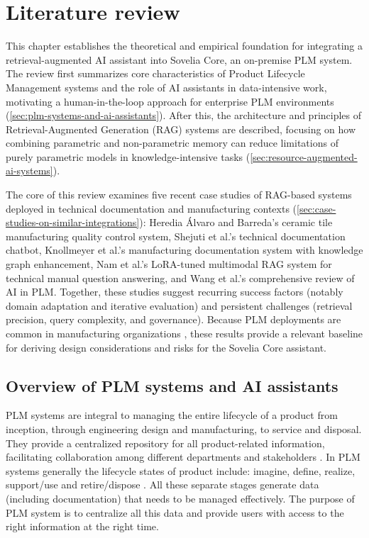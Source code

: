 \chapter{Literature review}
\label{ch:literature-review}

This chapter establishes the theoretical and empirical foundation for integrating a retrieval-augmented AI assistant into Sovelia Core, an on-premise PLM system. The review first summarizes core characteristics of Product Lifecycle Management systems and the role of AI assistants in data-intensive work, motivating a human-in-the-loop approach for enterprise PLM environments (\autoref{sec:plm-systems-and-ai-assistants}). After this, the architecture and principles of Retrieval-Augmented Generation (RAG) systems are described, focusing on how combining parametric and non-parametric memory can reduce limitations of purely parametric models in knowledge-intensive tasks (\autoref{sec:resource-augmented-ai-systems}).

The core of this review examines five recent case studies of RAG-based systems deployed in technical documentation and manufacturing contexts (\autoref{sec:case-studies-on-similar-integrations}): Heredia Álvaro and Barreda's ceramic tile manufacturing quality control system, Shejuti et al.'s technical documentation chatbot, Knollmeyer et al.'s manufacturing documentation system with knowledge graph enhancement, Nam et al.'s LoRA-tuned multimodal RAG system for technical manual question answering, and Wang et al.'s comprehensive review of AI in PLM. Together, these studies suggest recurring success factors (notably domain adaptation and iterative evaluation) and persistent challenges (retrieval precision, query complexity, and governance). Because PLM deployments are common in manufacturing organizations \parencite{starkProductLifecycleManagement2015}, these results provide a relevant baseline for deriving design considerations and risks for the Sovelia Core assistant.

\section{Overview of PLM systems and AI assistants}
\label{sec:plm-systems-and-ai-assistants}

PLM systems are integral to managing the entire lifecycle of a product from inception, through engineering design and manufacturing, to service and disposal. They provide a centralized repository for all product-related information, facilitating collaboration among different departments and stakeholders \parencite{starkProductLifecycleManagement2015}. In PLM systems generally the lifecycle states of product include: imagine, define, realize, support/use and retire/dispose \parencite{starkProductLifecycleManagement2015a}. All these separate stages generate data (including documentation) that needs to be managed effectively. The purpose of PLM system is to centralize all this data and provide users with access to the right information at the right time.

